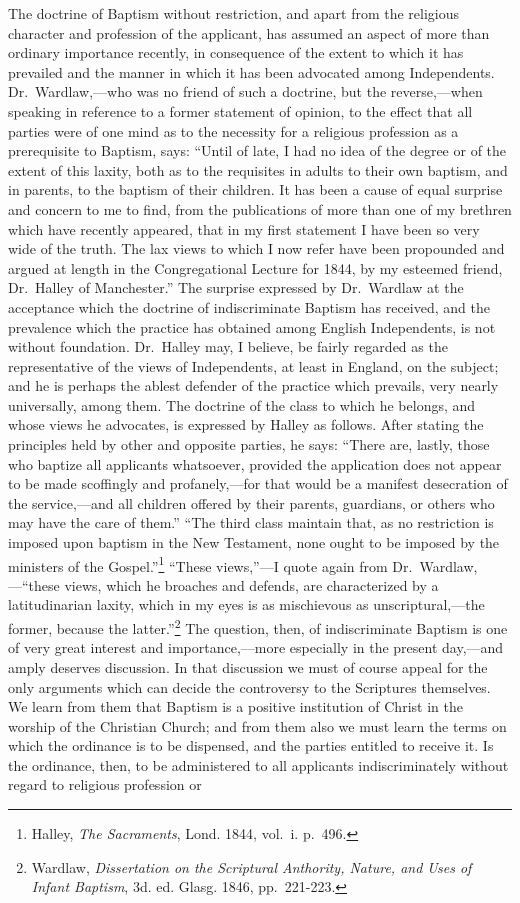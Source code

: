 \documentclass[]{book}
\begin{document}
The doctrine of Baptism without restriction, and apart from the religious character and profession of the applicant, has assumed an aspect of more than ordinary importance recently, in consequence of the extent to which it has prevailed and the manner in which it has been advocated among Independents. Dr.~Wardlaw,---who was no friend of such a doctrine, but the reverse,---when speaking in reference to a former statement of opinion, to the effect that all parties were of one mind as to the necessity for a religious profession as a prerequisite to Baptism, says: ``Until of late, I had no idea of the degree or of the extent of this laxity, both as to the requisites in adults to their own baptism, and in parents, to the baptism of their children. It has been a cause of equal surprise and concern to me to find, from the publications of more than one of my brethren which have recently appeared, that in my first statement I have been so very wide of the truth. The lax views to which I now refer have been propounded and argued at length in the Congregational Lecture for 1844, by my esteemed friend, Dr.~Halley of Manchester.'' The surprise expressed by Dr.~Wardlaw at the acceptance which the doctrine of indiscriminate Baptism has received, and the prevalence which the practice has obtained among English Independents, is not without foundation. Dr.~Halley may, I believe, be fairly regarded as the representative of the views of Independents, at least in England, on the subject; and he is perhaps the ablest defender of the practice which prevails, very nearly universally, among them. The doctrine of the class to which he belongs, and whose views he advocates, is expressed by Halley as follows. After stating the principles held by other and opposite parties, he says: ``There are, lastly, those who baptize all applicants whatsoever, provided the application does not appear to be made scoffingly and profanely,---for that would be a manifest desecration of the service,---and all children offered by their parents, guardians, or others who may have the care of them.'' ``The third class maintain that, as no restriction is imposed upon baptism in the New Testament, none ought to be imposed by the ministers of the Gospel.''\footnote{Halley, \emph{The Sacraments}, Lond. 1844, vol.~i. p.~496.} ``These views,''---I quote again from Dr.~Wardlaw,---``these views, which he broaches and defends, are characterized by a latitudinarian laxity, which in my eyes is as mischievous as unscriptural,---the former, because the latter.''\footnote{Wardlaw, \emph{Dissertation on the Scriptural Anthority, Nature, and Uses of Infant Baptism}, 3d. ed. Glasg. 1846, pp.~221-223.} The question, then, of indiscriminate Baptism is one of very great interest and importance,---more especially in the present day,---and amply deserves discussion. In that discussion we must of course appeal for the only arguments which can decide the controversy to the Scriptures themselves. We learn from them that Baptism is a positive institution of Christ in the worship of the Christian Church; and from them also we must learn the terms on which the ordinance is to be dispensed, and the parties entitled to receive it. Is the ordinance, then, to be administered to all applicants indiscriminately without regard to religious profession or 
\end{document}
